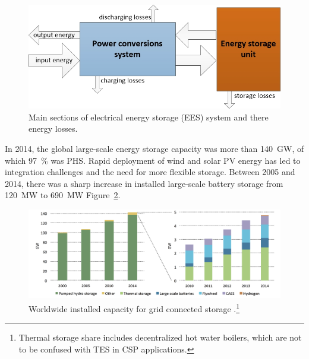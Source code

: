 \begin{figure}[htbp]  
\centering
\includegraphics[width=0.65\linewidth]{FIG/EESSchema}
\caption[Main sections of electrical energy storage system and there energy losses.]{Main sections of electrical energy storage (EES) system and there energy losses.}\label{TCC_EES}
\end{figure}
In 2014, the global large-scale energy storage capacity was more than \SI{140}{\giga\watt}, of which \SI{97}{\percent} was \ac{PHS}. Rapid deployment of wind and solar \ac{PV} energy has led to integration challenges and the need for more flexible storage. Between 2005 and 2014, there was a sharp increase in installed large-scale battery storage from \SI{120}{\mega\watt} to \SI{690}{\mega\watt} Figure~\ref{EESgridCapacity}.


\begin{figure}[htbp]  
\centering
\includegraphics[width=1\linewidth]{FIG/EESgridCapacity}
\caption[Worldwide installed capacity for grid connected storage.]{Worldwide installed capacity for grid connected storage \cite{IEA2015}.\footnote{Thermal storage share includes decentralized hot water boilers, which are not to be confused with TES in CSP applications.}}\label{EESgridCapacity}
\end{figure}

